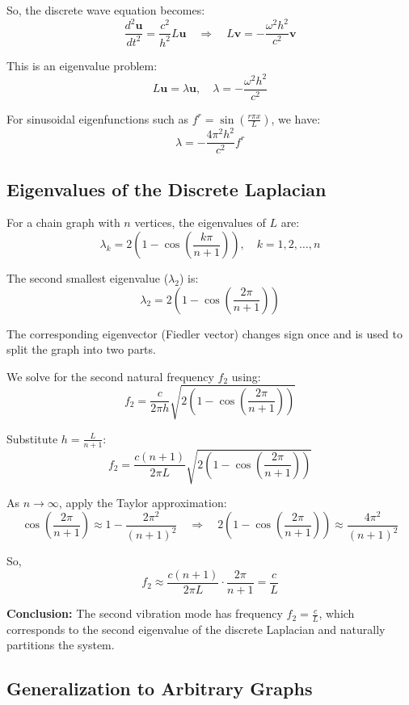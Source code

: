 \documentclass[hidelinks,12pt]{article}
\begin{document}
\noindent So, the discrete wave equation becomes:
\[
\frac{d^2 \mathbf{u}}{dt^2} = \frac{c^2}{h^2} L \mathbf{u}
\quad \Rightarrow \quad
L \mathbf{v} = -\frac{\omega^2 h^2}{c^2} \mathbf{v}
\]

\noindent This is an eigenvalue problem:
\[
L \mathbf{u} = \lambda \mathbf{u}, \quad \lambda = -\frac{\omega^2 h^2}{c^2}
\]

\noindent For sinusoidal eigenfunctions such as \( f^r = \sin\left(\frac{r \pi x}{L}\right) \), we have:
\[
\lambda = -\frac{4\pi^2 h^2}{c^2} f^r
\]

\subsection*{Eigenvalues of the Discrete Laplacian}

For a chain graph with \( n \) vertices, the eigenvalues of \( L \) are:
\[
\lambda_k = 2\left(1 - \cos\left(\frac{k\pi}{n+1}\right)\right), \quad k = 1,2,\dots,n
\]

\noindent The second smallest eigenvalue (\( \lambda_2 \)) is:
\[
\lambda_2 = 2\left(1 - \cos\left(\frac{2\pi}{n+1}\right)\right)
\]

\noindent The corresponding eigenvector (Fiedler vector) changes sign once and is used to split the graph into two parts.

\noindent We solve for the second natural frequency \( f_2 \) using:
\[
f_2 = \frac{c}{2\pi h} \sqrt{2\left(1 - \cos\left(\frac{2\pi}{n+1}\right)\right)}
\]

\noindent Substitute \( h = \frac{L}{n+1} \):
\[
f_2 = \frac{c(n+1)}{2\pi L} \sqrt{2\left(1 - \cos\left(\frac{2\pi}{n+1}\right)\right)}
\]

\noindent As \( n \to \infty \), apply the Taylor approximation:
\[
\cos\left(\frac{2\pi}{n+1}\right) \approx 1 - \frac{2\pi^2}{(n+1)^2}
\quad \Rightarrow \quad
2\left(1 - \cos\left(\frac{2\pi}{n+1}\right)\right) \approx \frac{4\pi^2}{(n+1)^2}
\]

\noindent So,
\[
f_2 \approx \frac{c(n+1)}{2\pi L} \cdot \frac{2\pi}{n+1} = \frac{c}{L}
\]

\noindent \textbf{Conclusion:} The second vibration mode has frequency \( f_2 = \frac{c}{L} \), which corresponds to the second eigenvalue of the discrete Laplacian and naturally partitions the system.

\subsection*{Generalization to Arbitrary Graphs}
\end{document}
